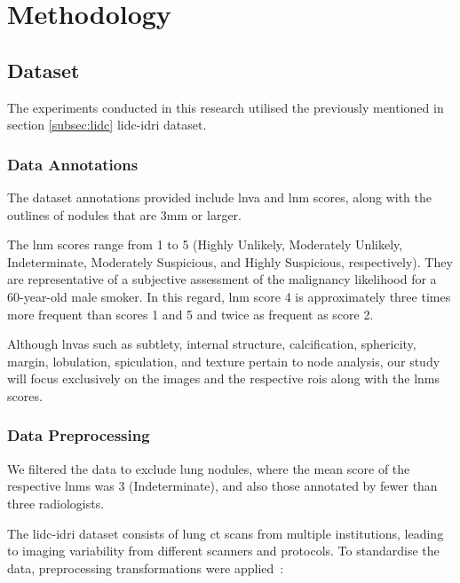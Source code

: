 \chapter{Methodology}

\section{Dataset}
The experiments conducted in this research utilised the previously mentioned in section \ref{subsec:lidc} \ac{lidc-idri} dataset. 

\subsection{Data Annotations}
The dataset annotations provided include \ac{lnva} and \ac{lnm} scores, along with the outlines of nodules that are 3mm or larger.

The \ac{lnm} scores range from 1 to 5 (Highly Unlikely, Moderately Unlikely, Indeterminate, Moderately Suspicious, and Highly Suspicious, respectively). They are representative of a subjective assessment of the malignancy likelihood for a 60-year-old male smoker.
In this regard, \ac{lnm} score 4 is approximately three times more frequent than scores 1 and 5 and twice as frequent as score 2.

Although \acp{lnva} such as subtlety, internal structure, calcification, sphericity, margin, lobulation, spiculation, and texture pertain to node analysis, our study will focus exclusively on the images and the respective \acp{roi} along with the \acp{lnm} scores.

\subsection{Data Preprocessing}

We filtered the data to exclude lung nodules, where the mean score of the respective \acp{lnm} was 3 (Indeterminate), and also those annotated by fewer than three radiologists.

The \ac{lidc-idri} dataset consists of lung \ac{ct} scans from multiple institutions, leading to imaging variability from different scanners and protocols. To standardise the data, preprocessing transformations were applied~\cite{rodrigues_efficient-proto-caps_2025}:

